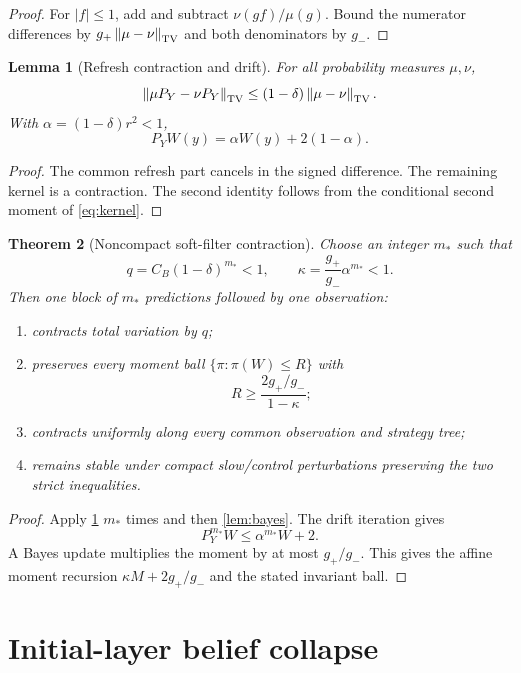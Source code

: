 \documentclass[11pt,reqno]{amsart}
\newtheorem{theorem}{Theorem}[section]
\newtheorem{lemma}[theorem]{Lemma}
\theoremstyle{definition}
\theoremstyle{remark}
\newcommand{\norm}[1]{\left\lVert #1\right\rVert}
\newcommand{\abs}[1]{\left\lvert #1\right\rvert}
\begin{document}
\begin{proof}
For $\abs f\le1$, add and subtract $\nu(gf)/\mu(g)$.  Bound the numerator
differences by $g_+\norm{\mu-\nu}_{\rm TV}$ and both denominators by $g_-$.
\end{proof}

\begin{lemma}[Refresh contraction and drift]\label{lem:refresh}
For all probability measures $\mu,\nu$,
\[
 \norm{\mu P_Y-\nu P_Y}_{\rm TV}
 \le(1-\delta)\norm{\mu-\nu}_{\rm TV}.
\]
With $\alpha=(1-\delta)r^2<1$,
\[
 P_YW(y)=\alpha W(y)+2(1-\alpha).
\]
\end{lemma}

\begin{proof}
The common refresh part cancels in the signed difference.  The remaining
kernel is a contraction.  The second identity follows from the conditional
second moment of \eqref{eq:kernel}.
\end{proof}

\begin{theorem}[Noncompact soft-filter contraction]\label{thm:filter}
Choose an integer $m_*$ such that
\[
 q=C_B(1-\delta)^{m_*}<1,\qquad
 \kappa=\frac{g_+}{g_-}\alpha^{m_*}<1.
\]
Then one block of $m_*$ predictions followed by one observation:
\begin{enumerate}[label=(\roman*)]
\item contracts total variation by $q$;
\item preserves every moment ball $\{\pi:\pi(W)\le R\}$ with
\[
 R\ge\frac{2g_+/g_-}{1-\kappa};
\]
\item contracts uniformly along every common observation and strategy tree;
\item remains stable under compact slow/control perturbations preserving the
two strict inequalities.
\end{enumerate}
\end{theorem}

\begin{proof}
Apply \cref{lem:refresh} $m_*$ times and then
\cref{lem:bayes}.  The drift iteration gives
\[
 P_Y^{m_*}W\le\alpha^{m_*}W+2.
\]
A Bayes update multiplies the moment by at most $g_+/g_-$.  This gives the
affine moment recursion $\kappa M+2g_+/g_-$ and the stated invariant ball.
\end{proof}

\section{Initial-layer belief collapse}\label{sec:initial-layer}
\end{document}
